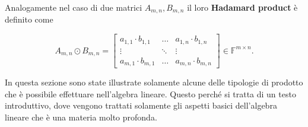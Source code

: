 Analogamente nel caso di due matrici $A_{m,n}, B_{m,n}$ il loro \textbf{Hadamard product} è definito come 

$$
A_{m,n} \odot B_{m,n} = \begin{bmatrix}
    a_{1,1} \cdot b_{1,1} & \dots & a_{1,n} \cdot b_{1,n}\\
    \vdots & \ddots & \vdots\\
    a_{m,1} \cdot b_{m,1} & \dots & a_{m,n} \cdot b_{m,n}
\end{bmatrix} \in \mathbb F^{m \times n}.
$$

In questa sezione sono state illustrate solamente alcune delle tipologie di prodotto che è possibile effettuare nell'algebra lineare. Questo perché si tratta di un testo introduttivo, dove vengono trattati solamente gli aspetti basici dell'algebra lineare che è una materia molto profonda.